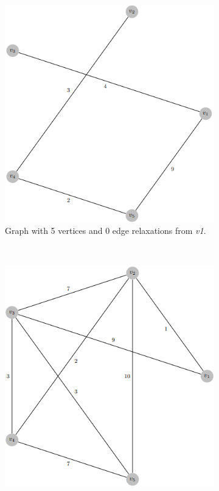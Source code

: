 \documentclass{l4proj}
\begin{document}
\begin{figure}
    \centering
    \begin{subfigure}[b]{0.49\textwidth}
        \includegraphics[width=\textwidth]{images/0relax.png}
        \caption{Graph with 5 vertices and 0 edge relaxations from \emph{v1}.}
        \label{fig:0rel}
    \end{subfigure}
    ~ %
    \begin{subfigure}[b]{0.49\textwidth}
        \includegraphics[width=\textwidth]{images/4relax.png}

\end{subfigure}
\end{figure}
\end{document}
